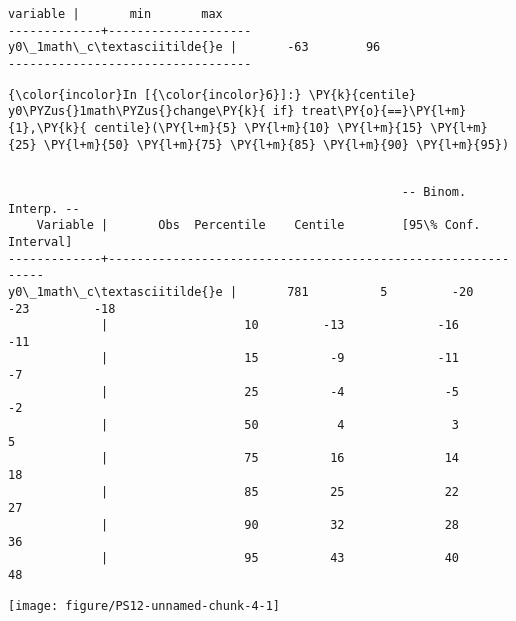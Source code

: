 \documentclass[11pt,notitlepage]{article}\usepackage[]{graphicx}\usepackage[]{color}
\makeatletter
\newenvironment{kframe}{%
 \def\at@end@of@kframe{}%
 \ifinner\ifhmode%
  \def\at@end@of@kframe{\end{minipage}}%
  \begin{minipage}{\columnwidth}%
 \fi\fi%
 \def\FrameCommand##1{\hskip\@totalleftmargin \hskip-\fboxsep
 \colorbox{shadecolor}{##1}\hskip-\fboxsep
     \hskip-\linewidth \hskip-\@totalleftmargin \hskip\columnwidth}%
 \MakeFramed {\advance\hsize-\width
   \@totalleftmargin\z@ \linewidth\hsize
   \@setminipage}}%
 {\par\unskip\endMakeFramed%
 \at@end@of@kframe}
\newenvironment{knitrout}{}{} %
\makeatother
\begin{document}
\begin{enumerate}[a)]
\begin{knitrout}
\begin{kframe}
\begin{Verbatim}[commandchars=\\\{\}]
    variable |       min       max
-------------+--------------------
y0\_1math\_c\textasciitilde{}e |       -63        96
----------------------------------

    \end{Verbatim}

    \begin{Verbatim}[commandchars=\\\{\}]
{\color{incolor}In [{\color{incolor}6}]:} \PY{k}{centile} y0\PYZus{}1math\PYZus{}change\PY{k}{ if} treat\PY{o}{==}\PY{l+m}{1},\PY{k}{ centile}(\PY{l+m}{5} \PY{l+m}{10} \PY{l+m}{15} \PY{l+m}{25} \PY{l+m}{50} \PY{l+m}{75} \PY{l+m}{85} \PY{l+m}{90} \PY{l+m}{95})
\end{Verbatim}

    \begin{Verbatim}[commandchars=\\\{\}]

                                                       -- Binom. Interp. --
    Variable |       Obs  Percentile    Centile        [95\% Conf. Interval]
-------------+-------------------------------------------------------------
y0\_1math\_c\textasciitilde{}e |       781          5         -20             -23         -18
             |                   10         -13             -16         -11
             |                   15          -9             -11          -7
             |                   25          -4              -5          -2
             |                   50           4               3           5
             |                   75          16              14          18
             |                   85          25              22          27
             |                   90          32              28          36
             |                   95          43              40          48

    \end{Verbatim}
\end{kframe}


{\centering \texttt{[image: figure/PS12-unnamed-chunk-4-1]} 

}

\end{knitrout}




\end{enumerate}
\end{document}
